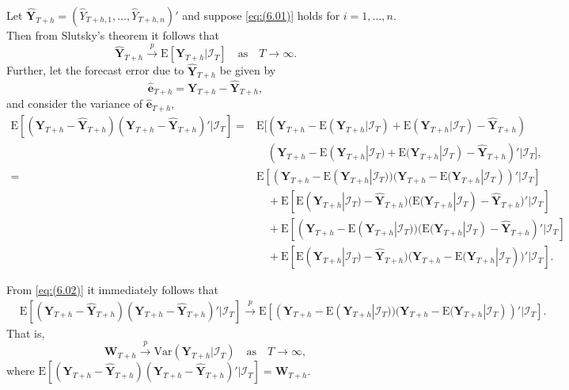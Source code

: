 \documentclass[a4paper, 11pt]{article}
\def\E{\text{E}}
\theoremstyle{theo}
\theoremstyle{definition}
\begin{document}
Let $\hat{\bm{Y}}_{T+h}=(\hat{Y}_{T+h,1},\dots,\hat{Y}_{T+h,n})'$ and suppose \eqref{eq:(6.01)} holds for $i=1,\dots,n$. Then from Slutsky's theorem it follows that
\begin{equation}\label{eq:(6.02)}
\hat{\bm{Y}}_{T+h} \overset{p}{\to} \E[\bm{Y}_{T+h}|\bm{\mathcal{I}}_T] \quad \text{as} \quad T \to \infty.
\end{equation}
Further, let the forecast error due to $\hat{\bm{Y}}_{T+h}$ be given by
\begin{equation}
\hat{\bm{e}}_{T+h} = \bm{Y}_{T+h}-\hat{\bm{Y}}_{T+h},
\end{equation}
and consider the variance of $\hat{\bm{e}}_{T+h}$,
\begin{align*}
\E[(\bm{Y}_{T+h} - \hat{\bm{Y}}_{T+h})(\bm{Y}_{T+h} - \hat{\bm{Y}}_{T+h})'|\bm{\mathcal{I}}_T] = &
\E[(\bm{Y}_{T+h} - \E(\bm{Y}_{T+h}|\bm{\mathcal{I}}_T) + \E(\bm{Y}_{T+h}|\bm{\mathcal{I}}_T)- \hat{\bm{Y}}_{T+h})\\
& \quad
(\bm{Y}_{T+h} - \E(\bm{Y}_{T+h}|\bm{\mathcal{I}}_T) + \E(\bm{Y}_{T+h}|\bm{\mathcal{I}}_T) - \hat{\bm{Y}}_{T+h})'|\bm{\mathcal{I}}_T],\\
= &
\E[(\bm{Y}_{T+h} - \E(\bm{Y}_{T+h}|\bm{\mathcal{I}}_T))(\bm{Y}_{T+h} - \E(\bm{Y}_{T+h}|\bm{\mathcal{I}}_T))'|\bm{\mathcal{I}}_T]\\
& \quad
+ \E[\E(\bm{Y}_{T+h}|\bm{\mathcal{I}}_T) - \hat{\bm{Y}}_{T+h})(\E(\bm{Y}_{T+h}|\bm{\mathcal{I}}_T) - \hat{\bm{Y}}_{T+h})'|\bm{\mathcal{I}}_T]\\
& \quad
+  \E[(\bm{Y}_{T+h} - \E(\bm{Y}_{T+h}|\bm{\mathcal{I}}_T))(\E(\bm{Y}_{T+h}|\bm{\mathcal{I}}_T) - \hat{\bm{Y}}_{T+h})'|\bm{\mathcal{I}}_T]\\
&  \quad
+ \E[\E(\bm{Y}_{T+h}|\bm{\mathcal{I}}_T) - \hat{\bm{Y}}_{T+h})(\bm{Y}_{T+h} - \E(\bm{Y}_{T+h}|\bm{\mathcal{I}}_T))'|\bm{\mathcal{I}}_T].
\end{align*}

From \eqref{eq:(6.02)} it immediately follows that
\begin{align*}
&\E[(\bm{Y}_{T+h} - \hat{\bm{Y}}_{T+h})(\bm{Y}_{T+h} - \hat{\bm{Y}}_{T+h})'|\bm{\mathcal{I}}_T] \overset{p}{\to} \E[(\bm{Y}_{T+h} - \E(\bm{Y}_{T+h}|\bm{\mathcal{I}}_T))(\bm{Y}_{T+h} - \E(\bm{Y}_{T+h}|\bm{\mathcal{I}}_T))'|\bm{\mathcal{I}}_T].
\end{align*}
That is,
\begin{equation}
\bm{W}_{T+h} \overset{p}{\to} \text{Var}(\bm{Y}_{T+h}|\bm{\mathcal{I}}_T) \quad \text{as} \quad T \to \infty,
\end{equation}
where $\E[(\bm{Y}_{T+h} - \hat{\bm{Y}}_{T+h})(\bm{Y}_{T+h} - \hat{\bm{Y}}_{T+h})'|\bm{\mathcal{I}}_T] = \bm{W}_{T+h}$.
\end{document}
